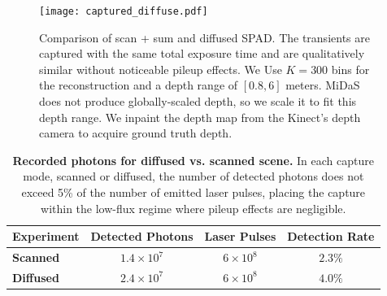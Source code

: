 \documentclass[runningheads]{llncs}
\begin{document}
\begin{figure}[H]
  \centering \texttt{[image: captured\_diffuse.pdf]}
  \caption{Comparison of scan + sum and diffused SPAD. The transients are captured
      with the same total exposure time and are qualitatively similar without 
      noticeable pileup effects. We Use $K = 300$ bins for the reconstruction
      and a depth range of $[0.8, 6]$ meters. MiDaS \cite{Lasinger:2019} does
      not produce globally-scaled depth, so we scale it to fit this depth range.
      We inpaint the depth map from the Kinect's depth camera to acquire ground
      truth depth.}
  \label{fig:comparison}
\end{figure}

\begin{table}[ht!]
    \renewcommand{\arraystretch}{1.3}
    \setlength{\tabcolsep}{10pt}
     \centering
     \begin{tabular}{lccc} \toprule
         \textbf{Experiment} & \textbf{Detected Photons} & \textbf{Laser Pulses} & \textbf{Detection Rate} \\\hline
         \textbf{Scanned} & $1.4\times10^7$ & $6\times10^8$ & $2.3\%$ \\
         \textbf{Diffused} & $2.4\times10^7$ & $6\times10^8$ & $4.0\%$ \\
        \bottomrule
    \end{tabular}
    \vspace{0.4em}
    \caption{\textbf{Recorded photons for diffused vs. scanned scene.} In each capture mode, scanned or diffused, the number of detected photons does not exceed 5\% of the number of emitted laser pulses, placing the capture within the low-flux regime where pileup effects are negligible.}
    \label{tab:photon_counts}
\end{table}
\end{document}
